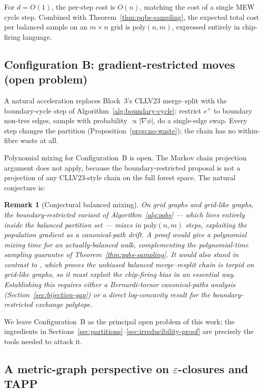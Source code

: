 \documentclass[11pt]{article}
\newtheorem{remark}{Remark}[section]
\begin{document}
For $d = O(1)$, the per-step cost is $O(n)$, matching the cost of a single
MEW cycle step. Combined with Theorem~\ref{thm:pqbs-sampling}, the
expected total cost per balanced sample on an $m \times n$ grid is
$\mathrm{poly}(n,m)$, expressed entirely in chip-firing language.

\subsection{Configuration B: gradient-restricted moves (open problem)}\label{sec:config-b}

A natural acceleration replaces Block~3's CLLV23 merge--split with the
boundary-cycle step of Algorithm~\ref{alg:boundary-cycle}: restrict $e^+$
to boundary non-tree edges, sample with probability $\propto |\nabla\phi|$,
do a single-edge swap. Every step changes the partition
(Proposition~\ref{prop:no-waste}); the chain has no within-fibre waste at
all.

Polynomial mixing for Configuration~B is open. The Markov chain
projection argument does not apply, because the boundary-restricted
proposal is not a projection of any CLLV23-style chain on the full forest
space. The natural conjecture is:

\begin{remark}[Conjectural balanced mixing]\label{rem:conj-b}
On grid graphs and grid-like graphs, the boundary-restricted variant of
Algorithm~\ref{alg:pqbs} --- which lives entirely inside the balanced
partition set --- mixes in $\mathrm{poly}(n,m)$ steps, exploiting the
population gradient as a canonical-path drift. A proof would give a
polynomial mixing time for an actually-balanced walk, complementing the
polynomial-time \emph{sampling} guarantee of
Theorem~\ref{thm:pqbs-sampling}. It would also stand in contrast to
\cite[Theorem 15]{charikar2023complexity}, which proves the unbiased
balanced merge--resplit chain is torpid on grid-like graphs, so it must
exploit the chip-firing bias in an essential way. Establishing this
requires either a Bernardi-torsor canonical-paths analysis
(Section~\ref{sec:bijection-gap}) or a direct log-concavity result for
the boundary-restricted exchange polytope.
\end{remark}

We leave Configuration~B as the principal open problem of this work; the
ingredients in Sections~\ref{sec:partitions}--\ref{sec:irreducibility-proof}
are precisely the tools needed to attack it.


\subsection{A metric-graph perspective on $\varepsilon$-closures and TAPP}\label{sec:metric-graph}
\end{document}
